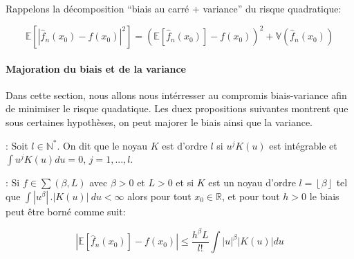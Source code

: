 \documentclass[
]{article}
\begin{document}
Rappelons la décomposition ``biais au carré + variance'' du risque
quadratique:

\[
  \mathbb{E}[|\hat {f}_n(x_0) - f(x_0)|^2] = (\mathbb{E}[\hat {f}_n(x_0)] - f(x_0))^2 + \mathbb{V}(\hat {f}_n(x_0))
\]

\paragraph{Majoration du biais et de la variance}

Dans cette section, nous allons nous intérresser au compromis
biais-variance afin de minimiser le risque quadatique. Les duex
propositions suivantes montrent que sous certaines hypothèses, on peut
majorer le biais ainsi que la variance.\newline

\begin{definition} : Soit $l \in \mathbb{N^*}$. On dit que le noyau $K$ est d'ordre $l$ si $u^jK(u)$ est intégrable et $\int u^jK(u)du = 0$, $j = {1,...,l}$.\newline
\end{definition}

\begin{proposition}: Si $f \in \sum(\beta,L)$ avec $\beta > 0$ et $L > 0$ et si $K$ est un noyau d'ordre $l = \left\lfloor{\beta}\right\rfloor$ tel que $\int |{u}^{\beta}|\,.|{K(u)}|~du < \infty$ alors pour tout $x_0 \in \mathbb{R}$, et pour tout $h>0$ le biais peut être borné comme suit:

$$
|\mathbb{E}[\hat{f}_n(x_0)] - f(x_0)|\leqslant \frac{h^{\beta}L}{l!}\int|u|^{\beta}|K(u)|du
$$
\end{proposition}
\end{document}
